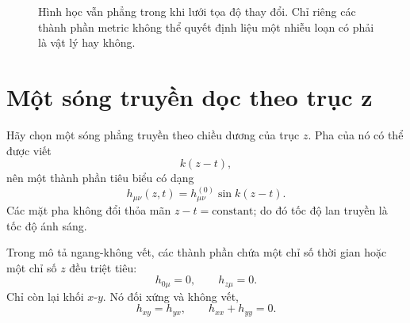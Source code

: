 \begin{figure}[htbp]
\centering
{}
\caption{Hình học vẫn phẳng trong khi lưới tọa độ thay đổi. Chỉ riêng các thành phần metric không thể quyết định liệu một nhiễu loạn có phải là vật lý hay không.}
\end{figure}

\section{Một sóng truyền dọc theo trục z}

Hãy chọn một sóng phẳng truyền theo chiều dương của trục \(z\). Pha của nó có thể được viết
\begin{equation}
 k(z-t),
\end{equation}
nên một thành phần tiêu biểu có dạng
\begin{equation}
 h_{\mu\nu}(z,t)
 =h_{\mu\nu}^{(0)}\sin k(z-t).
 \label{eq:plane-wave}
\end{equation}
Các mặt pha không đổi thỏa mãn \(z-t=\text{constant}\); do đó tốc độ lan truyền là tốc độ ánh sáng.

Trong mô tả ngang-không vết, các thành phần chứa một chỉ số thời gian hoặc một chỉ số \(z\) đều triệt tiêu:
\begin{equation}
 h_{0\mu}=0,
 \qquad
 h_{z\mu}=0.
 \label{eq:tt-transverse}
\end{equation}
Chỉ còn lại khối \(x\)-\(y\). Nó đối xứng và không vết,
\begin{equation}
 h_{xy}=h_{yx},
 \qquad
 h_{xx}+h_{yy}=0.
 \label{eq:tt-trace}
\end{equation}

